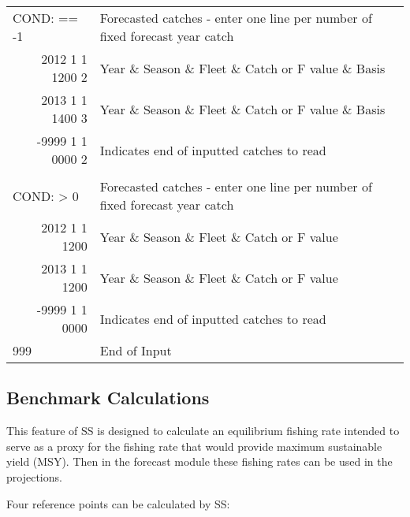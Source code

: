 \begin{landscape}
{\begin{longtable}{p{3.2cm} p{7cm} p{10.8cm}}
  \hline
  \multicolumn{1}{l}{COND: == -1 }& \multicolumn{2}{l}{Forecasted catches - enter one line per number of fixed forecast year catch} \Tstrut\\
  \multicolumn{1}{r}{2012 1 1 1200 2}  & \multicolumn{2}{l}{Year \& Season \& Fleet \& Catch or F value \& Basis}  \\
  \multicolumn{1}{r}{2013 1 1 1400 3}  & \multicolumn{2}{l}{Year \& Season \& Fleet \& Catch or F value \& Basis}  \\
  \multicolumn{1}{r}{-9999 1 1 0000 2}  & \multicolumn{2}{l}{Indicates end of inputted catches to read}  \Bstrut\\
  \\
  \multicolumn{1}{l}{COND: > 0 }& \multicolumn{2}{l}{Forecasted catches - enter one line per number of fixed forecast year catch }\Tstrut\\
  \multicolumn{1}{r}{2012  1 1 1200}  & \multicolumn{2}{l}{Year \& Season \& Fleet \& Catch or F value}  \\
  \multicolumn{1}{r}{2013  1 1 1200}  & \multicolumn{2}{l}{Year \& Season \& Fleet \& Catch or F value}  \\
  \multicolumn{1}{r}{-9999 1 1 0000}  & \multicolumn{2}{l}{Indicates end of inputted catches to read}  \Bstrut\\
  
  \hline
  999 & End of Input & \Bstrut\\

  \end{longtable}}  
\end{landscape}

\hypertarget{Benchmark}{}
\subsection{Benchmark Calculations}
This feature of SS is designed to calculate an equilibrium fishing rate intended to serve as a proxy for the fishing rate that would provide maximum sustainable yield (MSY).  Then in the forecast module these fishing rates can be used in the projections.

Four reference points can be calculated by SS:

